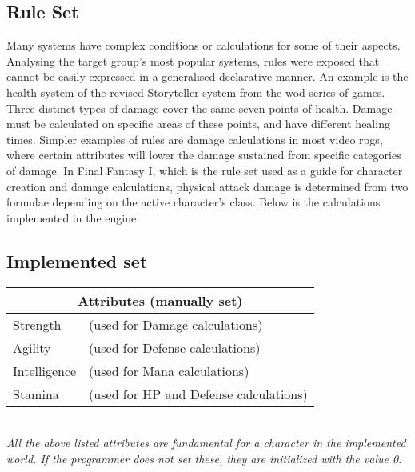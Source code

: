 \subsection{\langname{} Rule Set}
\label{language:ruleset}
Many systems have complex conditions or calculations for some of their aspects.
Analysing the target group's most popular systems, rules were exposed that cannot be easily expressed in a generalised declarative manner.
An example is the health system of the revised Storyteller system from the \ac{wod} series of games. Three distinct types of damage cover the same seven points of health. Damage must be calculated on specific areas of these points, and have different healing times.
Simpler examples of rules are damage calculations in most video \ac{rpgs},
where certain attributes will lower the damage sustained from specific categories of damage. In Final Fantasy I, which is the rule set used as a guide for character creation and damage calculations, physical attack damage is determined from two formulae depending on the active character's class. Below is the calculations implemented in the engine:

\subsection{Implemented set}
\label{language:implset}
\begin{center}
\begin{tabular}{|l l|}
\hline
\multicolumn{2}{|c|}{\textbf{Attributes (manually set)}}\\
\hline
Strength & (used for Damage calculations)\\
\hline
Agility & (used for Defense calculations)\\
\hline
Intelligence & (used for Mana calculations)\\
\hline
Stamina & (used for HP and Defense calculations)\\
\hline
\end{tabular}\\
\emph{All the above listed attributes are fundamental for a character in the implemented world. If the programmer does not set these, they are initialized with the value 0.}
\end{center}

